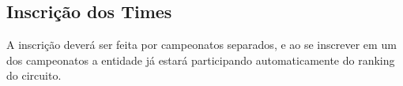 \subsection{Inscrição dos Times}

A inscrição deverá ser feita por campeonatos separados, e ao se inscrever em um dos campeonatos a entidade já estará participando automaticamente do ranking do circuito.

